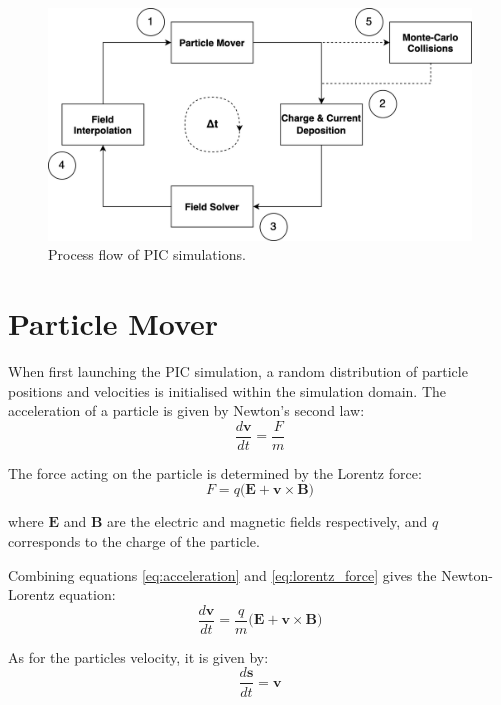 \begin{figure}[h!]
	\centering
	\includegraphics[width=\linewidth]{particle_in_cell/figures/pic_flowchart.png}
	\caption{Process flow of PIC simulations.}
	\label{fig:pic_flowchart}
\end{figure} 


\section{Particle Mover}

When first launching the PIC simulation, a random distribution of particle positions and velocities is initialised within the simulation domain. The acceleration of a particle is given by Newton's second law:
\begin{equation}
	\frac{d\bm{v}}{dt} = \frac{F}{m}
	\label{eq:acceleration}
\end{equation}

The force acting on the particle is determined by the Lorentz force:
\begin{equation}
	F = q(\bm{E} + \bm{v} \times \bm{B)}
	\label{eq:lorentz_force}
\end{equation}

where $\bm{E}$ and $\bm{B}$ are the electric and magnetic fields respectively, and $q$ corresponds to the charge of the particle.

Combining equations \ref{eq:acceleration} and \ref{eq:lorentz_force} gives the Newton-Lorentz equation:
\begin{equation}
	\frac{d\bm{v}}{dt} = \frac{q}{m}(\bm{E} + \bm{v} \times \bm{B)}
	\label{eq:newton_lorentz}
\end{equation}

As for the particles velocity, it is given by: 
\begin{equation}
	\frac{d\bm{s}}{dt} = \bm{v}
	\label{eq:velocity}
\end{equation}

